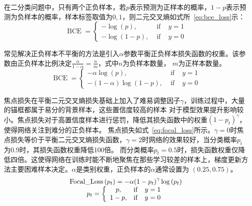 在二分类问题中，只有两个正负样本，若$p$表示预测为正样本的概率，$1-p$表示预测为负样本的概率，样本标签取值为$0,1$，则二元交叉熵如式所~\ref{eq:bce_loss}示：
\begin{equation}         
  \operatorname{BCE}=\left\{\begin{array}{ccc} -\log (p), & \text { if } & y=1 \\ -\log (1-p), & \text { if } & y=0 \end{array}\right.  
  \label{eq:bce_loss}   
\end{equation} 

常见解决正负样本不平衡的方法是引入$\alpha$参数平衡正负样本损失函数的权重。该参数由正负样本比例决定$\frac{\alpha}{1-\alpha} = \frac{n}{m}$，式中$n$为负样本数量，
$m$为正样本数量。
\begin{equation}            
  \operatorname{BCE}=\left\{\begin{array}{ccc} -\alpha \log (p), & \text { if } & y=1 \\ -(1-\alpha) \log (1-p), & \text { if } & y=0 \end{array}\right.    
  \label{eq:bce_loss_alpha}    
\end{equation} 

焦点损失在平衡二元交叉熵损失基础上加入了难易调整因子$\gamma$，训练过程中，大量的锚框都属于易分的背景样本，这些置信度较高的样本
对于模型效果提升影响较小。焦点损失对于高置信度样本进行惩罚，降低其损失函数中的权重$(1-p_t)^{\gamma}$，使得网络关注到难分的正负样本。
焦点损失如式~\ref{eq:focal_loss}所示。$\gamma=0$时焦点损失等价于平衡二元交叉熵损失函数，$\gamma=2$时网络的效果较好，当分类概率$p_t$为0.9时，其损失函数权重降低100倍。
而分类概率$p_t = 0.5$时，损失函数权重仅降低四倍。这使得网络在训练时能不断地聚焦在那些学习较差的样本上，梯度更新方法主要困难样本决定。$\alpha$是类别权重，正负样本的$\alpha$通常设置为
$(0.25, 0.75)$。
\begin{equation}               
  \begin{array}{*{20}{c}} {{\rm{Focal\_Loss}}\left( {{p_t}} \right) =  - \alpha {{\left( {1 - {p_t}} \right)}^\gamma }\log \left( {{p_t}} \right)}\\ 
    {{p_t} = \left\{ {\begin{array}{*{20}{c}} {p,}&{{\rm{ if }}}&{y = 1}\\ {1 - p,}&{{\rm{ if }}}&{y = 0} \end{array}} \right.} \end{array}    
  \label{eq:focal_loss}     
\end{equation} 

